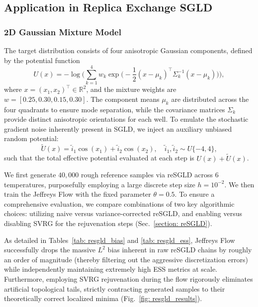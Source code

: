 \documentclass[%
 reprint,
 amsmath,amssymb,
 aps,
 pre,
]{revtex4-2}
\begin{document}
\subsection{Application in Replica Exchange SGLD}

\subsubsection*{2D Gaussian Mixture Model}

The target distribution consists of four anisotropic Gaussian components, defined by the potential function
\begin{equation*}
	U(x) = -\log \bigg( \sum_{k=1}^4 w_k \exp \Big( -\frac{1}{2}(x - \mu_k)^\top \Sigma_k^{-1} (x - \mu_k) \Big) \bigg),
\end{equation*}
where $x = (x_1, x_2)^\top \in \mathbb{R}^2$, and the mixture weights are $w = [0.25, 0.30, 0.15, 0.30]$. The component means $\mu_k$ are distributed across the four quadrants to ensure mode separation, while the covariance matrices $\Sigma_k$ provide distinct anisotropic orientations for each well. To emulate the stochastic gradient noise inherently present in SGLD, we inject an auxiliary unbiased random potential:
\begin{equation*}
	\tilde{U}(x) = \tilde{i}_1 \cos(x_1) + \tilde{i}_2 \cos(x_2), \quad \tilde{i}_1, \tilde{i}_2 \sim U\{-4, 4\},
\end{equation*}
such that the total effective potential evaluated at each step is $U(x) + \tilde{U}(x)$.

We first generate $40,000$ rough reference samples via reSGLD across $6$ temperatures, purposefully employing a large discrete step size $h = 10^{-2}$. We then train the Jeffreys Flow with the fixed parameter $\theta = 0.5$. To ensure a comprehensive evaluation, we compare combinations of two key algorithmic choices: utilizing naive versus variance-corrected reSGLD, and enabling versus disabling SVRG for the rejuvenation steps (Sec.~\ref{section: reSGLD}).

As detailed in Tables~\ref{tab: resgld_bias} and \ref{tab: resgld_ess}, Jeffreys Flow successfully drops the massive $L^2$ bias inherent in raw reSGLD chains by roughly an order of magnitude (thereby filtering out the aggressive discretization errors) while independently maintaining extremely high ESS metrics at scale. Furthermore, employing SVRG rejuvenation during the flow rigorously eliminates artificial topological tails, strictly contracting generated samples to their theoretically correct localized minima (Fig.~\ref{fig: resgld_results}).
\end{document}
